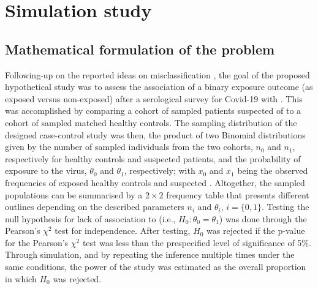 \section{Simulation study}

\subsection{Mathematical formulation of the problem}

Following-up on the reported ideas on misclassification \citep{malato2021Statisticalchallenges}, the goal of the proposed hypothetical study was to assess the association of a binary exposure outcome (as exposed versus non-exposed) after a serological survey for Covid-19 with \cfs. This was accomplished by comparing a cohort of sampled patients suspected of \cfs to a cohort of sampled matched healthy controls. The sampling distribution of the designed case-control study was then, the product of two Binomial distributions given by the number of sampled individuals from the two cohorts, $n_0$ and $n_1$, respectively for healthy controls and suspected \cfs patients, and the probability of exposure to the virus, $\theta_0$ and $\theta_1$, respectively; with $x_0$ and $x_1$ being the observed frequencies of exposed healthy controls and suspected \cfs \citep{malato2021Statisticalchallenges}. Altogether, the sampled populations can be summarised by a $2 \times 2$ frequency table that presents different outlines depending on the described parameters $n_i$ and $\theta_i$, $i = \{0,1\}$. Testing the null hypothesis for lack of association to \cfs (i.e., $H_0: \theta_0 = \theta_1$) was done through the Pearson's $\chi^2$ test for independence. After testing, $H_0$ was rejected if the p-value for the Pearson's $\chi^2$ test was less than the prespecified level of significance of 5\%. Through simulation, and by repeating the inference multiple times under the same conditions, the power of the study was estimated as the overall proportion in which $H_0$ was rejected.

